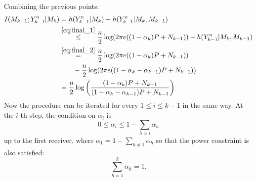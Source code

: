 Combining the previous points:
\begin{equation}
  \begin{split}
    I(M_{k-1};Y^n_{k-1}|M_k) &= h(Y_{k-1}^n|M_{k}) - h(Y_{k-1}^n|M_k,M_{k-1})\\
    &\overset{\eqref{eq:final_1}}{\leq} \frac{n}{2}\log(2\pi e ((1-\alpha_k) P+N_{k-1})) - h(Y_{k-1}^n|M_k,M_{k-1})\\
    &\overset{\eqref{eq:final_2}}{=}\frac{n}{2}\log(2\pi e ((1-\alpha_k) P+N_{k-1}))\\
    &\qquad -\frac{n}{2}\log(2\pi e ((1-\alpha_k-\alpha_{k-1}) P+N_{k-1}))\\
    &= \frac{n}{2}\log\left(\frac{(1-\alpha_k) P+N_{k-1}}{(1-\alpha_k-\alpha_{k-1}) P+N_{k-1}}\right)
  \end{split}
  \label{eq:final_k-1}
\end{equation}
Now the procedure can be iterated for every $1\leq i\leq k-1$ in the same way. At the $i$-th step, the condition on $\alpha_i$ is
\begin{equation}
  0\leq \alpha_i \leq 1-\sum_{h>i}\alpha_h
\end{equation}
up to the first receiver, where $\alpha_1 = 1-\sum_{h\neq 1}\alpha_h$ so that the power constraint is also satisfied:
\begin{equation}
\sum_{h = 1}^k \alpha_h = 1.
\end{equation}

